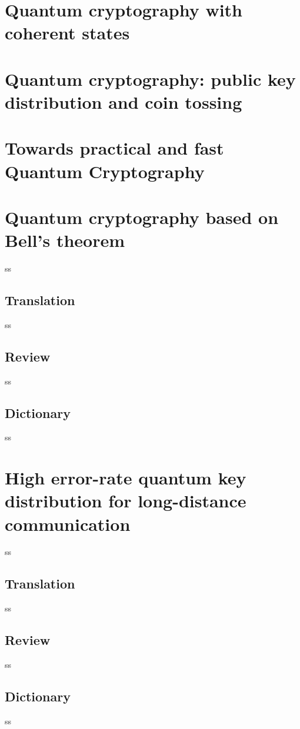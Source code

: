 

\newcommand{\trnas}{Translation}
\newcommand{\dic}{Dictionary}
\newcommand{\review}{Review}




\tableofcontents
\clearpage
\section{Quantum cryptography with coherent states}

%
\section{Quantum cryptography: public key distribution and coin tossing}



\section{Towards practical and fast Quantum Cryptography}




\section{Quantum cryptography based on Bell's theorem}
ss
\subsection*{\trnas}
ss
\subsection*{\review}
ss
\subsection*{\dic}
ss
\section{High error-rate quantum key distribution for long-distance communication }
ss
\subsection*{\trnas}
ss
\subsection*{\review}
ss
\subsection*{\dic}
ss

